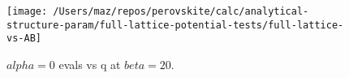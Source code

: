 \documentclass[a4paper,prb,twocolumn]{revtex4-1}  %
\newcommand{\com}[1]{}
\begin{document}
\com{
Since the qualitative picture stays the same
in FL case,
we can 
think of the effect of the rest of the ions in the lattice
still in terms of the AB cages by renormalising $q_A$.
}




\begin{figure}[htbp]
\begin{center}
\texttt{[image: /Users/maz/repos/perovskite/calc/analytical-structure-param/full-lattice-potential-tests/full-lattice-vs-AB]}
\caption{$alpha=0$ evals vs q at $beta=20$. 
}
\label{fig:t2g-lattice}
\end{center}
\end{figure}






\end{document}
